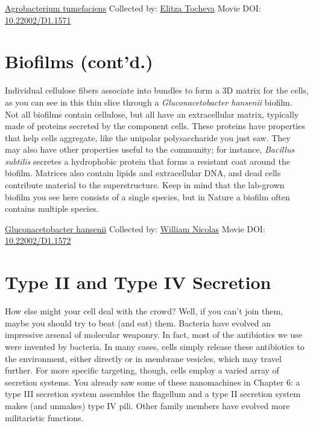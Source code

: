 \documentclass[]{tufte-book}
\begin{document}
\hypertarget{htmlwidget-2843223f07a38abc57b6}{}

\label{fig:9-1}\protect\hyperlink{tree}{Agrobacterium tumefaciens} Collected by: \protect\hyperlink{elitza_tocheva}{Elitza Tocheva} Movie DOI: \href{https://doi.org/10.22002/D1.1571}{10.22002/D1.1571}

\hypertarget{biofilms-contd.}{%
\section{Biofilms (cont'd.)}\label{biofilms-contd.}}

Individual cellulose fibers associate into bundles to form a 3D matrix for the cells, as you can see in this thin slice through a \emph{Gluconacetobacter hansenii} biofilm. Not all biofilms contain cellulose, but all have an extracellular matrix, typically made of proteins secreted by the component cells. These proteins have properties that help cells aggregate, like the unipolar polysaccharide you just saw. They may also have other properties useful to the community; for instance, \emph{Bacillus subtilis} secretes a hydrophobic protein that forms a resistant coat around the biofilm. Matrices also contain lipids and extracellular DNA, and dead cells contribute material to the superstructure. Keep in mind that the lab-grown biofilm you see here consists of a single species, but in Nature a biofilm often contains multiple species.



\hypertarget{htmlwidget-267bce1f1e0eb5b8d1a6}{}

\label{fig:9-2}\protect\hyperlink{tree}{Gluconacetobacter hansenii} Collected by: \protect\hyperlink{william_nicolas}{William Nicolas} Movie DOI: \href{https://doi.org/10.22002/D1.1572}{10.22002/D1.1572}

\hypertarget{type-ii-and-type-iv-secretion}{%
\section{Type II and Type IV Secretion}\label{type-ii-and-type-iv-secretion}}

How else might your cell deal with the crowd? Well, if you can't join them, maybe you should try to beat (and eat) them. Bacteria have evolved an impressive arsenal of molecular weaponry. In fact, most of the antibiotics we use were invented by bacteria. In many cases, cells simply release these antibiotics to the environment, either directly or in membrane vesicles, which may travel further. For more specific targeting, though, cells employ a varied array of secretion systems. You already saw some of these nanomachines in Chapter 6: a type III secretion system assembles the flagellum and a type II secretion system makes (and unmakes) type IV pili. Other family members have evolved more militaristic functions.
\end{document}
